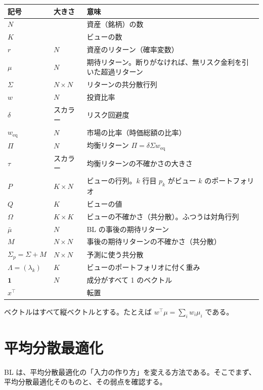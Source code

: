 \documentclass[xelatex,ja=standard,jafont=hiragino-pron,a4paper,11pt,openany]{bxjsreport}
\newcommand{\T}{^{\top}}
\newcommand{\weq}{w_{\mathrm{eq}}}
\newcommand{\mub}{\bar{\mu}}
\newcommand{\Sp}{\Sigma_{p}}
\newcommand{\one}{\mathbf{1}}
\begin{document}
\begin{center}
\small
\begin{tabular}{p{2.6cm}p{1.8cm}p{8.6cm}}
\toprule
記号 & 大きさ & 意味 \\
\midrule
$N$ & & 資産（銘柄）の数 \\
$K$ & & ビューの数 \\
$r$ & $N$ & 資産のリターン（確率変数） \\
$\mu$ & $N$ & 期待リターン。断りがなければ、無リスク金利を引いた超過リターン \\
$\Sigma$ & $N \times N$ & リターンの共分散行列 \\
$w$ & $N$ & 投資比率 \\
$\delta$ & スカラー & リスク回避度 \\
$\weq$ & $N$ & 市場の比率（時価総額の比率） \\
$\Pi$ & $N$ & 均衡リターン $\Pi = \delta\Sigma\weq$ \\
$\tau$ & スカラー & 均衡リターンの不確かさの大きさ \\
$P$ & $K \times N$ & ビューの行列。$k$ 行目 $p_k$ がビュー $k$ のポートフォリオ \\
$Q$ & $K$ & ビューの値 \\
$\Omega$ & $K \times K$ & ビューの不確かさ（共分散）。ふつうは対角行列 \\
$\mub$ & $N$ & BL の事後の期待リターン \\
$M$ & $N \times N$ & 事後の期待リターンの不確かさ（共分散） \\
$\Sp = \Sigma + M$ & $N \times N$ & 予測に使う共分散 \\
$\Lambda = (\lambda_k)$ & $K$ & ビューのポートフォリオに付く重み \\
$\one$ & $N$ & 成分がすべて 1 のベクトル \\
$x\T$ & & 転置 \\
\bottomrule
\end{tabular}
\end{center}

ベクトルはすべて縦ベクトルとする。たとえば $w\T\mu = \sum_i w_i \mu_i$ である。

\chapter{平均分散最適化}\label{ch:mv}

BL は、平均分散最適化の「入力の作り方」を変える方法である。そこでまず、平均分散最適化そのものと、その弱点を確認する。
\end{document}
